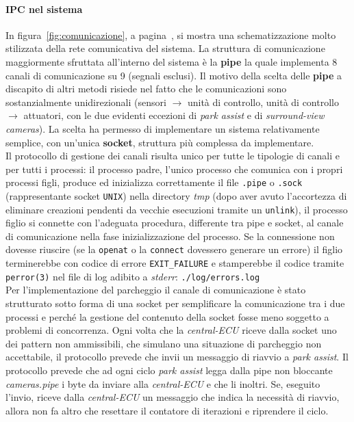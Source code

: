 \documentclass[11pt, openany]{article}
\theoremstyle{definition}
\theoremstyle{plain}
\theoremstyle{remark}
\begin{document}
	\paragraph{IPC nel sistema}
	In figura~\ref{fig:comunicazione}, a pagina~\pageref{fig:comunicazione}, si mostra una schematizzazione molto stilizzata della rete comunicativa del sistema.
	La struttura di comunicazione maggiormente sfruttata all'interno del sistema è la \textbf{pipe} la quale implementa 8 canali di comunicazione su 9 (segnali esclusi). Il motivo della scelta delle \textbf{pipe} a discapito di altri metodi risiede nel fatto che le comunicazioni sono sostanzialmente unidirezionali (sensori $\rightarrow$ unità di controllo, unità di controllo $\rightarrow$ attuatori, con le due evidenti eccezioni di \textit{park assist} e di \textit{surround-view cameras}). La scelta ha permesso di implementare un sistema relativamente semplice, con un'unica \textbf{socket}, struttura più complessa da implementare.\\
	Il protocollo di gestione dei canali risulta unico per tutte le tipologie di canali e per tutti i processi: il processo padre, l'unico processo che comunica con i propri processi figli, produce ed inizializza correttamente il file \texttt{.pipe} o \texttt{.sock} (rappresentante socket \texttt{UNIX}) nella directory \textit{tmp} (dopo aver avuto l'accortezza di eliminare creazioni pendenti da vecchie esecuzioni tramite un \texttt{unlink}), il processo figlio si connette con  l'adeguata procedura, differente tra pipe e socket, al canale di comunicazione nella fase inizializzazione del processo. Se la connessione non dovesse riuscire (se la \texttt{openat} o la \texttt{connect} dovessero generare un errore) il figlio terminerebbe con codice di errore \texttt{EXIT\_FAILURE} e stamperebbe il codice tramite \texttt{perror(3)} nel file di log adibito a \textit{stderr}: \texttt{./log/errors.log}\\
	Per l'implementazione del parcheggio il canale di comunicazione è stato strutturato sotto forma di una socket per semplificare la comunicazione tra i due processi e perché la gestione del contenuto della socket fosse meno soggetto a problemi di concorrenza. Ogni volta che la \textit{central-ECU} riceve dalla socket uno dei pattern non ammissibili, che simulano una situazione di parcheggio non accettabile, il protocollo prevede che invii un messaggio di riavvio a \textit{park assist}. Il protocollo prevede che ad ogni ciclo \textit{park assist} legga dalla pipe non bloccante \textit{cameras.pipe} i byte da inviare alla \textit{central-ECU} e che li inoltri. Se, eseguito l'invio, riceve dalla \textit{central-ECU} un messaggio che indica la necessità di riavvio, allora non fa altro che resettare il contatore di iterazioni e riprendere il ciclo.
\end{document}
